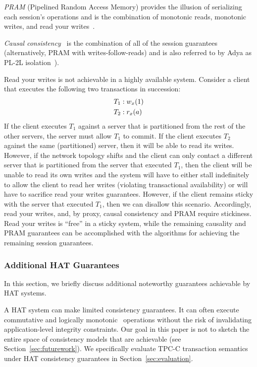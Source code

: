 \vspace{.5em}\noindent\textit{{PRAM}} (Pipelined Random Access
Memory) provides the illusion of serializing each session's operations
and is the combination of monotonic reads, monotonic writes, and read
your writes~\cite{herlihy-art}.

\vspace{.5em}\noindent\textit{{Causal
    consistency}}~\cite{causalmemory} is the combination of all of the
session guarantees~\cite{sessiontocausal} (alternatively, PRAM with
writes-follow-reads) and is also referred to by Adya as PL-2L
isolation~\cite{adya}).\vspace{.5em}


Read your writes is not achievable in a highly available
system. Consider a client that executes the following two transactions
in succession:
\vspace{-.5em}
\begin{align*}
\small
T_1 &: w_x(1)
\\T_2 &: r_x(a)
\end{align*}
If the client executes $T_1$ against a server that is partitioned from
the rest of the other servers, the server must allow $T_1$ to
commit. If the client executes $T_2$ against the same (partitioned)
server, then it will be able to read its writes. However, if the
network topology shifts and the client can only contact a different
server that is partitioned from the server that executed $T_1$, then
the client will be unable to read its own writes and the system will
have to either stall indefinitely to allow the client to read her
writes (violating transactional availability) or will have to
sacrifice read your writes guarantees. However, if the client remains
sticky with the server that executed $T_1$, then we can disallow this
scenario. Accordingly, read your writes, and, by proxy, causal
consistency and PRAM require stickiness. Read your writes is ``free''
in a sticky system, while the remaining causality and PRAM guarantees
can be accomplished with the algorithms for achieving the remaining
session guarantees.

\subsubsection{Additional HAT Guarantees}

In this section, we briefly discuss additional noteworthy guarantees
achievable by HAT systems.

\vspace{0.5em}
 A HAT system can make limited
consistency guarantees. It can often execute commutative and logically
monotonic~\cite{calm} operations without the risk of invalidating
 application-level integrity constraints. Our goal in
this paper is not to sketch the entire space of consistency models
that are achievable (see Section~\ref{sec:futurework}). We
specifically evaluate TPC-C transaction semantics under HAT
consistency guarantees in Section~\ref{sec:evaluation}.

